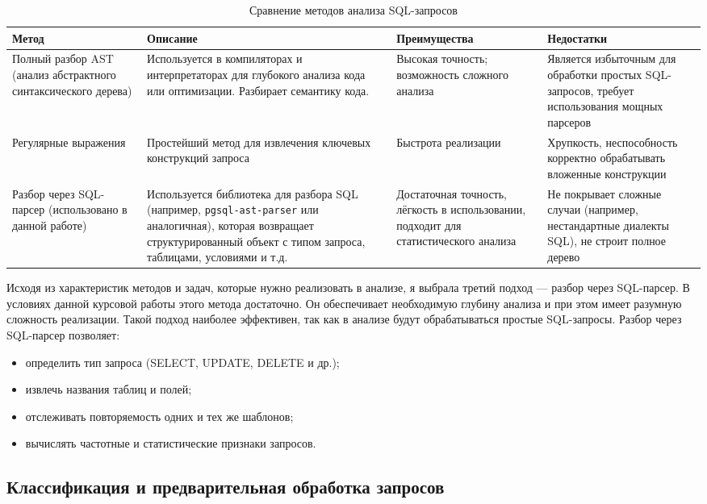 \documentclass[14pt]{extarticle}
\begin{document}
\begin{table}[!htbp]
\centering
\renewcommand{\arraystretch}{1.4}
\begin{tabular}{|p{4cm}|p{4.5cm}|p{3.5cm}|p{3.5cm}|}
\hline
\textbf{Метод} & \textbf{Описание} & \textbf{Преимущества} & \textbf{Недостатки} \\
\hline
Полный разбор AST (анализ абстрактного синтаксического дерева) & Используется в компиляторах и интерпретаторах для глубокого анализа кода или оптимизации. Разбирает семантику кода. & Высокая точность; возможность сложного анализа & Является избыточным для обработки простых SQL-запросов, требует использования мощных парсеров \\
\hline
Регулярные выражения & Простейший метод для извлечения ключевых конструкций запроса & Быстрота реализации & Хрупкость, неспособность корректно обрабатывать вложенные конструкции \\
\hline
Разбор через SQL-парсер (использовано в данной работе) & Используется библиотека для разбора SQL (например, \texttt{pgsql-ast-parser} или аналогичная), которая возвращает структурированный объект с типом запроса, таблицами, условиями и т.д. & Достаточная точность, лёгкость в использовании, подходит для статистического анализа & Не покрывает сложные случаи (например, нестандартные диалекты SQL), не строит полное дерево \\
\hline
\end{tabular}
\caption{Сравнение методов анализа SQL-запросов}
\end{table}


Исходя из характеристик методов и задач, которые нужно реализовать в анализе, я выбрала третий подход --- разбор через SQL-парсер. В условиях данной курсовой работы этого метода достаточно. Он обеспечивает необходимую глубину анализа и при этом имеет разумную сложность реализации. Такой подход наиболее эффективен, так как в анализе будут обрабатываться простые SQL-запросы. Разбор через SQL-парсер позволяет:
\begin{itemize}
    \item определить тип запроса (SELECT, UPDATE, DELETE и др.);
    \item извлечь названия таблиц и полей;
    \item отслеживать повторяемость одних и тех же шаблонов;
    \item вычислять частотные и статистические признаки запросов.
\end{itemize}

\subsection{Классификация и предварительная обработка запросов}
\end{document}
